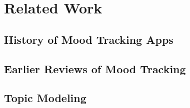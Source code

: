 \chapter{Related Work}
\section{History of Mood Tracking Apps}
\section{Earlier Reviews of Mood Tracking}
\section{Topic Modeling}